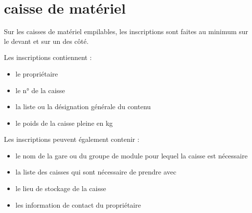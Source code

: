 \section{caisse de matériel}

Sur les caisses de matériel empilables, les inscriptions sont faites au minimum sur le devant et sur un des côté.

Les inscriptions contiennent :

\begin{itemize}
  \item le propriétaire
  \item le n° de la caisse
  \item la liste ou la désignation générale du contenu
  \item le poids de la caisse pleine en kg
\end{itemize}

Les inscriptions peuvent également contenir :

\begin{itemize}
  \item le nom de la gare ou du groupe de module pour lequel la caisse est nécessaire
  \item la liste des caisses qui sont nécessaire de prendre avec
  \item le lieu de stockage de la caisse
  \item les information de contact du propriétaire
\end{itemize}
